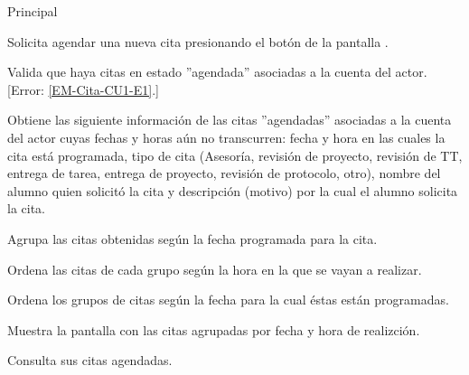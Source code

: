 \begin{UCtrayectoria}{Principal}

	\UCpaso [\UCactor] Solicita agendar una nueva cita presionando el botón \IUbutton{ + } de la pantalla .

	\UCpaso Valida que haya citas en estado ''agendada'' asociadas a la cuenta del actor. [Error: \ref{EM-Cita-CU1-E1}.]

	\UCpaso Obtiene las siguiente información de las citas ''agendadas'' asociadas a la cuenta del actor cuyas fechas y horas aún no transcurren: fecha y hora en las cuales la cita está programada, tipo de cita (Asesoría, revisión de proyecto, revisión de TT, entrega de tarea, entrega de proyecto, revisión de protocolo, otro), nombre del alumno quien solicitó la cita y descripción (motivo) por la cual el alumno solicita la cita.

	\UCpaso Agrupa las citas obtenidas según la fecha programada para la cita.

	\UCpaso Ordena las citas de cada grupo según la hora en la que se vayan a realizar. 

	\UCpaso Ordena los grupos de citas según la fecha para la cual éstas están programadas.

	\UCpaso Muestra la pantalla  con las citas agrupadas por fecha y hora de realizción. 

	\UCpaso [\UCactor] Consulta sus citas agendadas. 

\end{UCtrayectoria}
